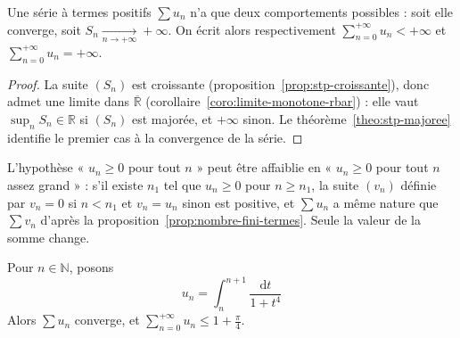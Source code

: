 \begin{coro}
\label{coro:stp-dichotomie}
Une série à termes positifs $\sum u_n$ n'a que deux comportements possibles : soit elle converge, soit $S_n\xrightarrow[n\to+\infty]{}+\infty$. On écrit alors respectivement $\sum_{n=0}^{+\infty}u_n<+\infty$ et $\sum_{n=0}^{+\infty}u_n=+\infty$.
\end{coro}

\begin{proof}
La suite $(S_n)$ est croissante (proposition~\ref{prop:stp-croissante}), donc admet une limite dans $\overline{\mathbb{R}}$ (corollaire~\ref{coro:limite-monotone-rbar}) : elle vaut $\sup_n S_n\in\mathbb{R}$ si $(S_n)$ est majorée, et $+\infty$ sinon. Le théorème~\ref{theo:stp-majoree} identifie le premier cas à la convergence de la série.
\end{proof}

\begin{center}
\end{center}

\begin{remarque}
L'hypothèse « $u_n\geq 0$ pour tout $n$ » peut être affaiblie en « $u_n\geq 0$ pour tout $n$ assez grand » : s'il existe $n_1$ tel que $u_n\geq 0$ pour $n\geq n_1$, la suite $(v_n)$ définie par $v_n=0$ si $n<n_1$ et $v_n=u_n$ sinon est positive, et $\sum u_n$ a même nature que $\sum v_n$ d'après la proposition~\ref{prop:nombre-fini-termes}. Seule la valeur de la somme change.
\end{remarque}

\begin{exemple}
\label{ex:stp-integrale}
Pour $n\in\mathbb{N}$, posons
\[u_n = \int_{n}^{n+1}\frac{\mathrm{d}t}{1+t^4}\]
Alors $\sum u_n$ converge, et $\sum_{n=0}^{+\infty}u_n\leq 1+\frac{\pi}{4}$.
\end{exemple}

